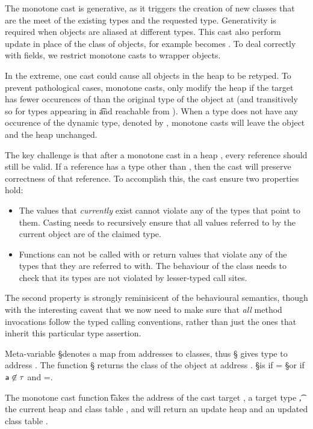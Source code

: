 \documentclass[a4paper,USenglish]{tex/lipics-v2016}
\begin{document}
The monotone cast is generative, as it triggers the creation of new classes
that are the meet of the existing types and the requested type. Generativity
is required when objects are aliased at different types.  This cast also
perform update in place of the class of objects, for example \obj\C{\a}
becomes \obj\D{\a}. To deal correctly with fields, we restrict monotone
casts to wrapper objects.


In the extreme, one cast could cause all objects in the heap to be
retyped. To prevent pathological cases, monotone casts, only modify the heap
if the target \C has fewer occurences of \any than the original type of the
object at \a (and transitively so for types appearing in \t and reachable
from \a).  When a type \C does not have any occurence of the dynamic type,
denoted by \statictype\C\K\V, monotone casts will leave the object and the
heap unchanged.

The key challenge is that after a monotone
cast in a heap \s, every reference should still be valid.  If a reference
has a type other than \any, then the cast will preserve correctness of that
reference. To accomplish this, the cast ensure two properties hold:
\begin{itemize}
\item The values that \emph{currently} exist cannot violate any of the types
  that point to them. Casting needs to recursively ensure that all values
  referred to by the current object are of the claimed type.
\item Functions can not be called with or return values that violate any of
  the types that they are referred to with. The behaviour of the class needs
  to check that its types are not violated by lesser-typed call sites.
\end{itemize}
The second property is strongly reminisicent of the behavioural semantics,
though with the interesting caveat that we now need to make sure that
\emph{all} method invocations follow the typed calling conventions, rather
than just the ones that inherit this particular type assertion.


Meta-variable \S denotes a map from addresses to classes, thus
\Map\S{\Bind\a\C} gives type \C to address \a. The function \htype\a\S\s\K
returns the class of the object at address \a.  \htype\a\S\s\K is \C if \C =
\App\S\a or if ${\sf{a}}\not\in\tau$ and \obj\C{\b\a}=\App\s\a.


The monotone cast function \moncast\a\t\s\K\Kp\sp takes the address of the
cast target \a, a target type \t, the current heap \s and class table \K, and
will return an update heap \sp and an updated class table \Kp.
\end{document}
